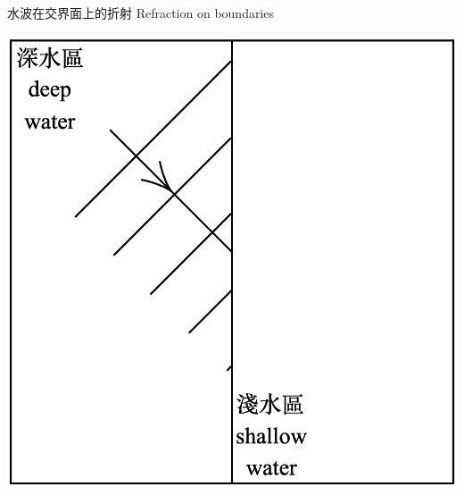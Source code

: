 \documentclass[beamer=true]{standalone}
\begin{document}
\begin{frame}{水波在交界面上的折射 Refraction on boundaries}


    \par{\par\centering\includegraphics[width=.6\textwidth]{./img/ch2_cf_2024-05-24-14-54-33.png}\par}
\end{frame}
\end{document}
